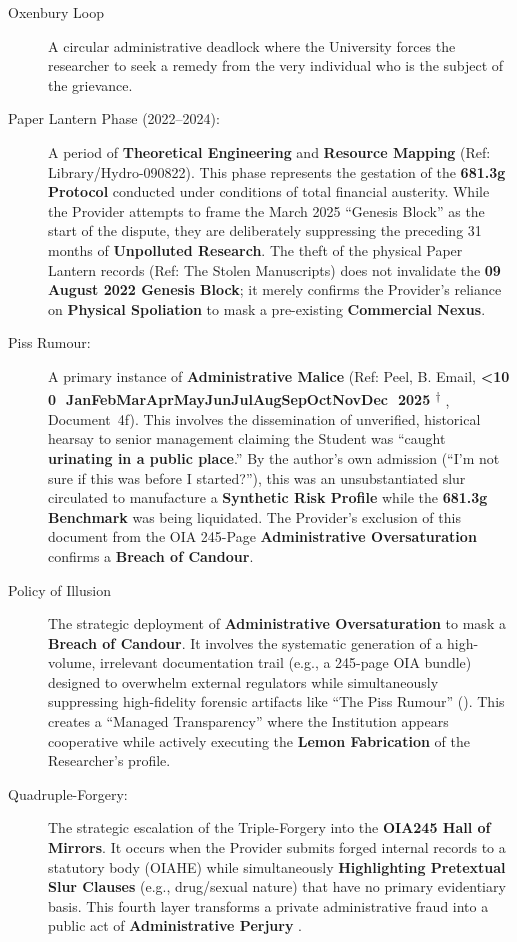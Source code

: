 \documentclass{EMBASSY}
\DeclareRobustCommand{\gmt}[3]{%
    \texorpdfstring{%
        {\color{DateGold}\textbf{%
            \ifnum#1<10 0\fi#1\,\textperiodcentered\,%
            \ifcase#2\or Jan\or Feb\or Mar\or Apr\or May\or Jun\or Jul\or Aug\or Sep\or Oct\or Nov\or Dec\fi
            \,\textperiodcentered\,20#3%
            \textsuperscript{$\dagger$}%
        }}%
    }{%
        (#1/#2/#3)%
    }%
}
\begin{document}
\begin{description}
	\item[Oxenbury Loop] A circular administrative deadlock where the University forces the researcher to seek a remedy from the very individual who is the subject of the grievance.
	\item[Paper Lantern Phase (2022--2024):] A period of \textbf{Theoretical Engineering} and \textbf{Resource Mapping} (Ref: Library/Hydro-090822). This phase represents the gestation of the \textbf{681.3g Protocol} conducted under conditions of total financial austerity. While the Provider attempts to frame the March 2025 ``Genesis Block'' as the start of the dispute, they are deliberately suppressing the preceding 31 months of \textbf{Unpolluted Research}. The theft of the physical Paper Lantern records (Ref: The Stolen Manuscripts) does not invalidate the \textbf{09 August 2022 Genesis Block}; it merely confirms the Provider’s reliance on \textbf{Physical Spoliation} to mask a pre-existing \textbf{Commercial Nexus}.
	\item[Piss Rumour:] A primary instance of \textbf{Administrative Malice} (Ref: Peel, B. Email, \gmt{5}{11}{25}, Document~4f). This involves the dissemination of unverified, historical hearsay to senior management claiming the Student was ``caught \textbf{urinating in a public place}.'' By the author’s own admission (``I'm not sure if this was before I started?''), this was an unsubstantiated slur circulated to manufacture a \textbf{Synthetic Risk Profile} while the \textbf{681.3g Benchmark} was being liquidated. The Provider's exclusion of this document from the OIA 245-Page \textbf{Administrative Oversaturation} confirms a \textbf{Breach of Candour}.
	\item[Policy of Illusion] The strategic deployment of \textbf{Administrative Oversaturation} to mask a \textbf{Breach of Candour}. It involves the systematic generation of a high-volume, irrelevant documentation trail (e.g., a 245-page OIA bundle) designed to overwhelm external regulators while simultaneously suppressing high-fidelity forensic artifacts like ``The Piss Rumour'' (\cite{OIA245}). This creates a ``Managed Transparency'' where the Institution appears cooperative while actively executing the \textbf{Lemon Fabrication} of the Researcher's profile.
	\item[Quadruple-Forgery:] The strategic escalation of the Triple-Forgery into the \textbf{OIA245 Hall of Mirrors}. It occurs when the Provider submits forged internal records to a statutory body (OIAHE) while simultaneously \textbf{Highlighting Pretextual Slur Clauses} (e.g., drug/sexual nature) that have no primary evidentiary basis. This fourth layer transforms a private administrative fraud into a public act of \textbf{Administrative Perjury} \cite{PerjuryAct11}.

\end{description}
\end{document}
